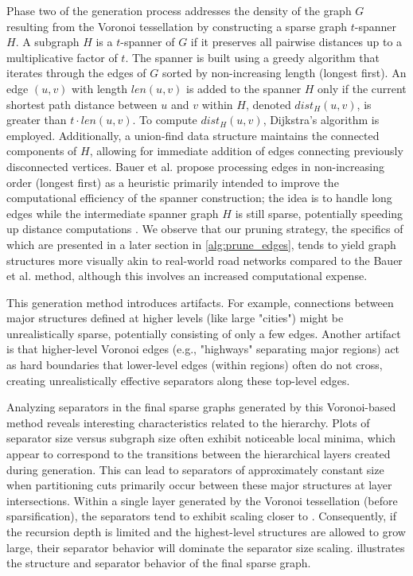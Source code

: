 Phase two of the generation process addresses the density of the graph \(G\) resulting from the Voronoi tessellation by constructing a sparse graph \(t\)-spanner \(H\).
A subgraph \(H\) is a \(t\)-spanner of \(G\) if it preserves all pairwise distances up to a multiplicative factor of \(t\).
The spanner is built using a greedy algorithm that iterates through the edges of \(G\) sorted by non-increasing length (longest first).
An edge \((u, v)\) with length \(len(u, v)\) is added to the spanner \(H\) only if the current shortest path distance between \(u\) and \(v\) within \(H\), denoted \(dist_H(u, v)\), is greater than \(t \cdot len(u, v)\).
To compute \(dist_H(u, v)\), Dijkstra's algorithm is employed.
Additionally, a union-find data structure maintains the connected components of \(H\), allowing for immediate addition of edges connecting previously disconnected vertices.
Bauer et al. propose processing edges in non-increasing order (longest first) as a heuristic primarily intended to improve the computational efficiency of the spanner construction; the idea is to handle long edges while the intermediate spanner graph \(H\) is still sparse, potentially speeding up distance computations \cite{hutchison_synthetic_2010}.
We observe that our pruning strategy, the specifics of which are presented in a later section in \cref{alg:prune_edges}, tends to yield graph structures more visually akin to real-world road networks compared to the Bauer et al. method, although this involves an increased computational expense.

This generation method introduces artifacts.
For example, connections between major structures defined at higher levels (like large "cities") might be unrealistically sparse, potentially consisting of only a few edges.
Another artifact is that higher-level Voronoi edges (e.g., "highways" separating major regions) act as hard boundaries that lower-level edges (within regions) often do not cross, creating unrealistically effective separators along these top-level edges.

Analyzing separators in the final sparse graphs generated by this Voronoi-based method reveals interesting characteristics related to the hierarchy.
Plots of separator size versus subgraph size often exhibit noticeable local minima, which appear to correspond to the transitions between the hierarchical layers created during generation.
This can lead to separators of approximately constant size when partitioning cuts primarily occur between these major structures at layer intersections.
Within a single layer generated by the Voronoi tessellation (before sparsification), the separators tend to exhibit scaling closer to .
Consequently, if the recursion depth is limited and the highest-level structures are allowed to grow large, their  separator behavior will dominate the separator size scaling.
 illustrates the structure and separator behavior of the final sparse graph.

